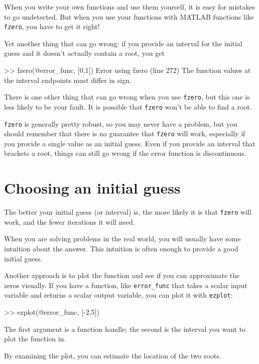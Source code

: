 \documentclass[
]{book}
\numberwithin{Answer}{chapter}
\numberwithin{Exercise}{chapter}
\begin{document}
When you write your own functions and use them yourself, it is easy
for mistakes to go undetected.  But when you use your functions with
MATLAB functions like {\tt fzero}, you have to get it right!

Yet another thing that can go wrong: if you provide an interval for the
initial guess and it doesn't actually contain a root, you get

\begin{code}
>> fzero(@error_func, [0,1])
Error using fzero (line 272)
The function values at the interval endpoints must differ in sign.
\end{code}

There is one other thing that can go wrong when you use {\tt fzero}, but
this one is less likely to be your fault.  It is possible that {\tt fzero}
won't be able to find a root.

{\tt fzero} is generally pretty robust, so you may never have a problem, but you should remember that there is no guarantee that {\tt fzero} will work, especially if you provide a single value as an initial guess.  Even if you provide an interval that brackets a root, things can still go wrong if the error function is discontinuous.


\section{Choosing an initial guess}

The better your initial guess (or interval) is, the more likely
it is that {\tt fzero} will work, and the fewer iterations it will
need.

When you are solving problems in the real world, you will usually
have some intuition about the answer.  This intuition is often enough
to provide a good initial guess.

Another approach is to plot the function and see if you can
approximate the zeros visually.  If you have a function, like
{\tt error\_func} that takes a scalar input variable and returns
a scalar output variable, you can plot it with {\tt ezplot}:

\begin{code}
>> ezplot(@error_func, [-2,5])
\end{code}


The first argument is a function handle; the second is the interval you want to plot the function in.

By examining the plot, you can estimate the location of the two roots.
\end{document}
